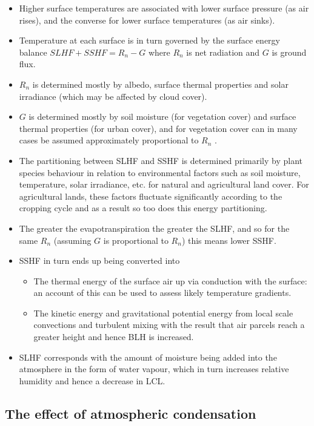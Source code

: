 \begin{itemize}
	\item Higher surface temperatures are associated with lower surface pressure (as air rises), and the converse for lower surface temperatures (as air sinks).
	\item Temperature at each surface is in turn governed by the surface energy balance $SLHF + SSHF = R_n - G$ where $R_n$ is net radiation and $G$ is ground flux.
	\item $R_n$ is determined mostly by albedo, surface thermal properties and solar irradiance (which may be affected by cloud cover).
	\item $G$ is determined mostly by soil moisture (for vegetation cover) and surface thermal properties (for urban cover), and for vegetation cover can in many cases be assumed approximately proportional to $R_n$ \citep{lyons1996}.
	\item The partitioning between \ac{SLHF} and \ac{SSHF} is determined primarily by plant species behaviour in relation to environmental factors such as soil moisture, temperature, solar irradiance, etc. for natural and agricultural land cover. For agricultural lands, these factors fluctuate significantly according to the cropping cycle and as a result so too does this energy partitioning.
	\item The greater the evapotranspiration the greater the \ac{SLHF}, and so for the same $R_n$ (assuming $G$ is proportional to $R_n$) this means lower \ac{SSHF}.
	\item \ac{SSHF} in turn ends up being converted into
	\begin{itemize}
		\item The thermal energy of the surface air up via conduction with the surface: an account of this can be used to assess likely temperature gradients.
		\item The kinetic energy and gravitational potential energy from local scale convections and turbulent mixing with the result that air parcels reach a greater height and hence \ac{BLH} is increased.
	\end{itemize}
	\item \ac{SLHF} corresponds with the amount of moisture being added into the atmosphere in the form of water vapour, which in turn increases relative humidity and hence a decrease in \ac{LCL}.
\end{itemize}

\subsection{The effect of atmospheric condensation}

